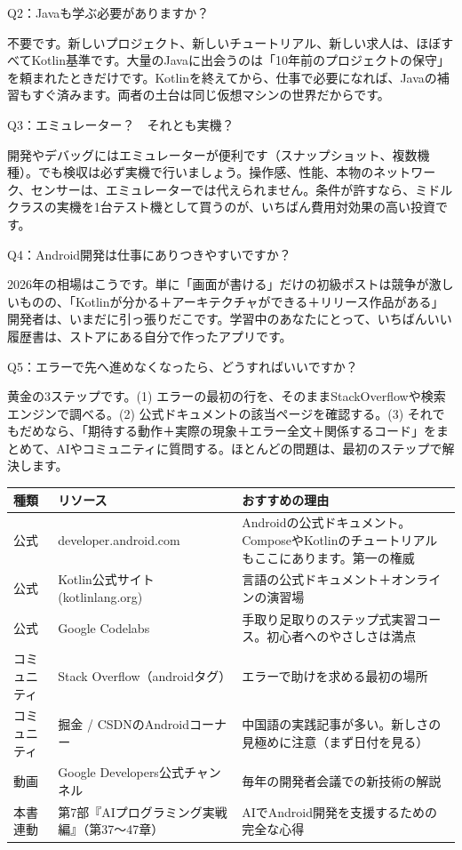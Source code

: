 Q2：Javaも学ぶ必要がありますか？

不要です。新しいプロジェクト、新しいチュートリアル、新しい求人は、ほぼすべてKotlin基準です。大量のJavaに出会うのは「10年前のプロジェクトの保守」を頼まれたときだけです。Kotlinを終えてから、仕事で必要になれば、Javaの補習もすぐ済みます。両者の土台は同じ仮想マシンの世界だからです。

Q3：エミュレーター？　それとも実機？

開発やデバッグにはエミュレーターが便利です（スナップショット、複数機種）。でも検収は必ず実機で行いましょう。操作感、性能、本物のネットワーク、センサーは、エミュレーターでは代えられません。条件が許すなら、ミドルクラスの実機を1台テスト機として買うのが、いちばん費用対効果の高い投資です。

Q4：Android開発は仕事にありつきやすいですか？

2026年の相場はこうです。単に「画面が書ける」だけの初級ポストは競争が激しいものの、「Kotlinが分かる＋アーキテクチャができる＋リリース作品がある」開発者は、いまだに引っ張りだこです。学習中のあなたにとって、いちばんいい履歴書は、ストアにある自分で作ったアプリです。

Q5：エラーで先へ進めなくなったら、どうすればいいですか？

黄金の3ステップです。(1) エラーの最初の行を、そのままStackOverflowや検索エンジンで調べる。(2) 公式ドキュメントの該当ページを確認する。(3) それでもだめなら、「期待する動作＋実際の現象＋エラー全文＋関係するコード」をまとめて、AIやコミュニティに質問する。ほとんどの問題は、最初のステップで解決します。


\begin{center}
\begin{tabularx}{\linewidth}{|X|X|X|}
\hline
\textbf{種類} & \textbf{リソース} & \textbf{おすすめの理由} \tabularnewline
\hline
公式 & developer.android.com & Androidの公式ドキュメント。ComposeやKotlinのチュートリアルもここにあります。第一の権威 \tabularnewline
公式 & Kotlin公式サイト (kotlinlang.org) & 言語の公式ドキュメント＋オンラインの演習場 \tabularnewline
公式 & Google Codelabs & 手取り足取りのステップ式実習コース。初心者へのやさしさは満点 \tabularnewline
コミュニティ & Stack Overflow（androidタグ） & エラーで助けを求める最初の場所 \tabularnewline
コミュニティ & 掘金 / CSDNのAndroidコーナー & 中国語の実践記事が多い。新しさの見極めに注意（まず日付を見る） \tabularnewline
動画 & Google Developers公式チャンネル & 毎年の開発者会議での新技術の解説 \tabularnewline
本書連動 & 第7部『AIプログラミング実戦編』（第37〜47章） & AIでAndroid開発を支援するための完全な心得 \tabularnewline
\hline
\end{tabularx}
\end{center}

